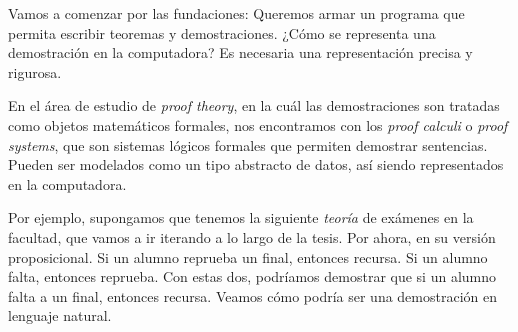 \newcommand{\reprueba}{X}
\newcommand{\recursa}{R}
\newcommand{\falta}{F}

\newcommand{\predReprueba}{\textrm{reprueba}}
\newcommand{\predRecursa}{\textrm{recursa}}
\newcommand{\predFalta}{\textrm{falta}}
\newcommand{\funFinal}{\textrm{final}}

\newcommand{\vAlu}{a}
\newcommand{\vMat}{m}
\newcommand{\vEx}{e}

\newcommand{\proofSpacing}{\vspace*{0.2cm}}


Vamos a comenzar por las fundaciones: Queremos armar un programa que permita
escribir teoremas y demostraciones. ¿Cómo se representa una demostración en la
computadora? Es necesaria una representación precisa y rigurosa.

En el área de estudio de \textit{proof theory}, en la cuál las
demostraciones son tratadas como objetos matemáticos formales, nos encontramos
con los \textit{proof calculi} o \textit{proof systems}, que son sistemas
lógicos formales que permiten demostrar sentencias. Pueden ser modelados como un
tipo abstracto de datos, así siendo representados en la computadora.

Por ejemplo, supongamos que tenemos la siguiente \textit{teoría} de exámenes en
la facultad, que vamos a ir iterando a lo largo de la tesis. Por ahora, en su
versión proposicional. Si un alumno reprueba un final, entonces recursa. Si un
alumno falta, entonces reprueba. Con estas dos, podríamos demostrar que si un
alumno falta a un final, entonces recursa. Veamos cómo podría ser una
demostración en lenguaje natural.

